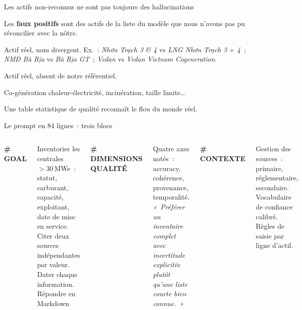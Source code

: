 \documentclass[aspectratio=169]{beamer}
\begin{document}
\begin{frame}{Les actifs non-reconnus ne sont pas toujours des hallucinations}

Les \textbf{faux positifs} sont des actifs de la liste du modèle que nous n'avons pas pu réconcilier avec la nôtre.

\medskip
\begin{description}\setlength\itemsep{6pt}
  \item[\textbf{Limite du matcher}] Actif réel, nom divergent.
        Ex.~: \emph{Nhơn Trạch 3 \& 4} vs \emph{LNG Nhơn Trạch 3} + \emph{4}~;
        \emph{NMĐ Bà Rịa} vs \emph{Bà Rịa GT}~;
        \emph{Vedan} vs \emph{Vedan Vietnam Cogeneration}.
  \item[\textbf{Limite du référentiel}] Actif réel, absent de notre référentiel.
  \item[\textbf{Interrogations statistiques}] Co-génération chaleur-électricité, incinération, taille limite\ldots
\end{description}

\medskip
\small Une table statistique de qualité reconnaît le flou du monde réel.

\end{frame}

\begin{frame}{Le prompt en 84 lignes~: trois blocs}
\begin{columns}[T]
\textbf{\# GOAL}

\smallskip
{\small Inventorier les centrales $>30$\,MWe~: statut, carburant, capacité, exploitant, date de mise en service.\\[4pt]
Citer deux sources indépendantes par valeur.\\[4pt]
Dater chaque information.\\[4pt]
Répondre en Markdown}

\textbf{\# DIMENSIONS QUALITÉ}

\smallskip
{\small Quatre axes notés~: accuracy, cohérence, provenance, temporalité.\\[4pt]
\textit{«~Préférer un inventaire complet avec incertitude explicitée plutôt qu'une liste courte bien connue.~»}}

\textbf{\# CONTEXTE}

\smallskip
{\small Gestion des sources~: primaire, réglementaire, secondaire.\\[4pt]
Vocabulaire de confiance calibré.\\[4pt]
Règles de saisie par ligne d'actif.}
\end{columns}

\end{frame}
\end{document}
